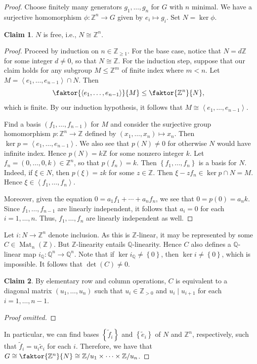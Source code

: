 \documentclass[10pt,letterpaper,cm]{nupset}
\theoremstyle{definition}
\theoremstyle{theorem}
\newtheorem*{claim}{Claim}
\theoremstyle{remark}
\newcommand{\Q}{\mathbb Q}
\newcommand{\Z}{\mathbb Z}
\newcommand{\1}{\mathbf{1}}
\newcommand{\0}{\vec 0}
\DeclareMathOperator{\Mat}{Mat}
\begin{document}
\begin{proof}
Choose finitely many generators $g_1, \ldots, g_n$ for $G$ with $n$ minimal. We have a surjective homomorphism $\phi : \Z^n \to G$ given by $e_i \mapsto g_i$. Set $ N = \ker{\phi}$.
\begin{claim}
$N$ is free, i.e., $N \cong \Z^n$.
\end{claim}
\begin{proof}
Proceed by induction on $n\in \Z_{\geq 1}$. For the base case, notice that  $N = d\Z$ for some integer $d\ne 0$, so that $N \cong \Z$. For the induction step, suppose that our claim holds for any subgroup $M\leq \Z^m$ of finite index where $m<n$. Let $M = \left\langle e_1, \ldots, e_{n-1}\right\rangle\cap N$. Then $$\faktor{\left\langle e_1, \ldots, e_{n-1}\right\rangle}{M}\leq \faktor{\Z^n}{N},$$ which is finite. By our induction hypothesis, it follows that $M \cong \left\langle e_1, \ldots, e_{n-1}\right\rangle$. 

Find a basis $\left(f_1, \ldots, f_{n-1}\right)$ for $M$ and consider the surjective group homomorphism $p : \Z^n \to \Z$ defined by $\left(x_1, \ldots, x_n\right) \mapsto x_n.$ Then $\ker{p} = \left\langle e_1, \ldots, e_{n-1}\right\rangle$. We also see that $p(N) \ne 0$ for otherwise $N$ would have infinite index. Hence $p(N) = k\Z$ for some nonzero integer $k$. Let $f_n = \left(0, \ldots, 0, k\right)\in \Z^n$, so that $p(f_n) =k$. Then $\left\{f_1, \ldots, f_n\right\}$ is a basis for $N$. Indeed, if $\xi \in N$, then $p(\xi) = zk$ for some $z\in \Z$. Then $\xi - zf_n \in \ker{p} \cap N = M$. Hence $\xi \in \left\langle f_1, \ldots, f_n\right\rangle$. 

Moreover, given the equation $0 = a_1f_1 + \cdots + a_nf_n$, we see that $0= p(0) = a_nk$. Since $f_1, \ldots, f_{n-1}$ are linearly independent, it follows that $a_i= 0$ for each $i=1, \ldots, n$. Thus, $f_1, \ldots, f_n$ are linearly independent as well.
\end{proof}
Let $i : N \to \Z^n$ denote inclusion. As this is $\Z$-linear, it may be represented by some $C\in \Mat_n(\Z)$. But $\Z$-linearity entails $\Q$-linearity. Hence $C$ also defines a $\Q$-linear map $i_{\Q} : \Q^n \to \Q^n$. Note that if $\ker{i_{\Q}} \ne \left\{0\right\}$, then $\ker{i} \ne \left\{0\right\}$, which is impossible. It follows that $\det(C) \ne 0$.

\begin{claim} %
By elementary row and column operations, $C$ is equivalent to a diagonal matrix $\left(u_1, \ldots, u_n\right)$ such that  $u_i \in \Z_{>0}$ and $u_i \mid u_{i+1}$ for each $i=1, \ldots, n-1$. 
\end{claim}
\begin{proof}[Proof omitted]
\end{proof}

 In particular, we can find bases $\left\{\tilde{f}_i\right\}$ and $\left\{\tilde{e}_i\right\}$ of $N$ and $\Z^n$, respectively, such that $ \tilde{f}_i = u_i \tilde{e}_i$ for each $i$. Therefore, we have that $G\cong \faktor{\Z^n}{N} \cong \Z/u_1 \times \cdots \times \Z/u_n$.
\end{proof}
\end{document}
